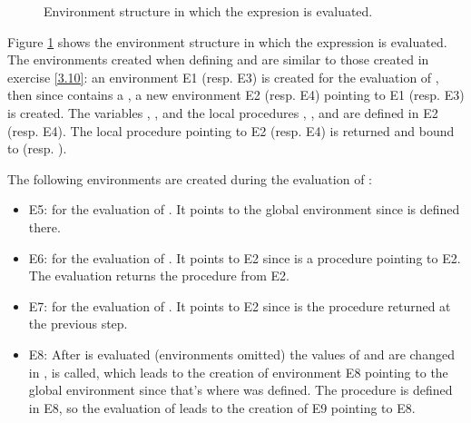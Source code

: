 \begin{exe}[3.36]
\begin{figure}
        \caption{Environment structure in which the expresion
         is 
        evaluated.}
        \label{3.36fig}
    \end{figure}

    Figure \ref{3.36fig} shows the environment structure in which the expression 
    is evaluated. The environments created when defining  and  
    are similar to those created in exercise \ref{3.10}: an environment E1 
    (resp. E3) is created for the evaluation of , then 
    since  contains a , a new environment E2 
    (resp. E4) pointing to E1 (resp. E3) is created. The variables , 
    ,  and the local procedures 
    , ,  and  
    are defined in E2 (resp. E4). The local procedure  pointing to E2 
    (resp. E4) is returned and bound to  (resp. ).

    The following environments are created during the evaluation of 
    :
    \begin{itemize}
        \item E5: for the evaluation of . It 
            points to the global environment since  is defined 
            there.
        \item E6: for the evaluation of . It points to E2 
            since  is a procedure pointing to E2. The evaluation returns 
            the  procedure from E2.
        \item E7: for the evaluation of . It 
            points to E2 since  is the procedure returned at 
            the previous step.
        \item E8: After  is evaluated (environments 
            omitted) the values of  and  are changed 
            in ,  is called, which 
            leads to the creation of environment E8 pointing to the global 
            environment since that’s where  was defined. 
            The  procedure is defined in E8, so the evaluation of 
             leads to the creation of E9 pointing to E8.


\end{itemize}
\end{exe}
